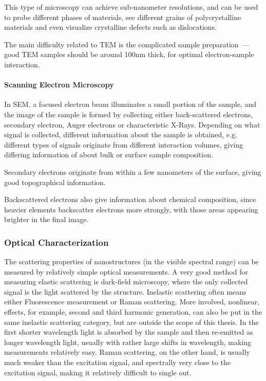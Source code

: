                     This type of microscopy can achieve sub-nanometer resolutions, and can be used to probe different phases of materials,
                see different grains of polycrystalline materials and even visualize crystalline defects such as dislocations.

                    The main difficulty related to TEM is the complicated sample preparation~--- good TEM samples should be around 100nm thick,
                for optimal electron-sample interaction.

            \paragraph{Scanning Electron Microscopy}
                    In SEM, a focused electron beam illuminates a small portion of the sample, and the image of the sample is formed by
                collecting either back-scattered electrons, secondary electron, Auger electrons or characteristic X-Rays. Depending on what
                signal is collected, different information about the sample is obtained, e.g. different types of signals originate from
                different interaction volumes, giving differing information of about bulk or surface sample composition.

                    Secondary electrons originate from within a few nanometers of the surface, giving good topographical information.

                    Backscattered electrons also give information about chemical composition, since heavier elements backscatter electrons
                more strongly, with those areas appearing brighter in the final image.

        \subsubsection{Optical Characterization}
        \label{sec:OpticalCharacterization}

                The scattering properties of nanostructures (in the visible spectral range) can be measured by relatively simple optical
            measurements. A very good method for measuring elastic scattering is dark-field microscopy, where the only collected signal
            is the light scattered by the structure. Inelastic scattering often means either Fluorescence measurement or Raman scattering.
            More involved, nonlinear, effects, for example, second and third harmonic generation, can also be put in the same inelastic scattering category,
            but are outside the scope of this thesis.
            In the first shorter wavelength light is absorbed by the sample and then re-emitted as longer wavelength light, usually with
            rather large shifts in wavelength, making measurements relatively easy. Raman scattering, on the other hand, is usually much weaker
            than the excitation signal, and spectrally very close to the excitation signal, making it relatively difficult to single out.

